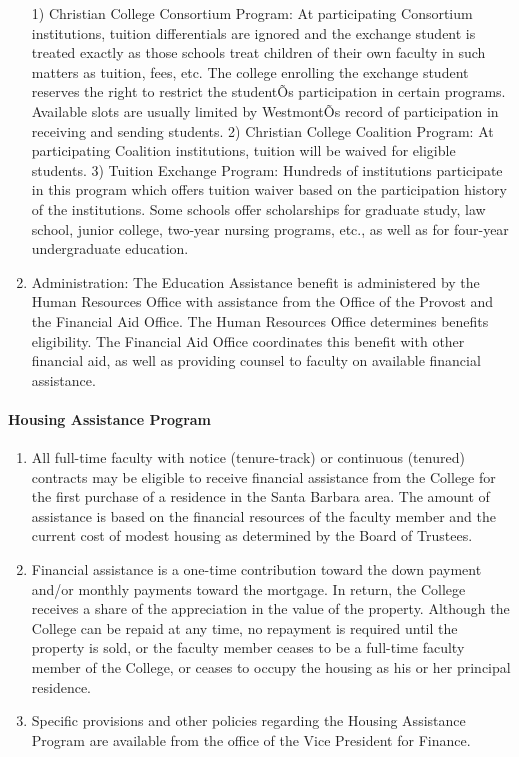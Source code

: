 \documentclass[letterpaper, 11pt]{article}
\begin{document}
\begin{enumerate}[label=\alph*)]
					1) Christian College Consortium Program:  At participating Consortium institutions, tuition differentials are ignored and the exchange student is treated exactly as those schools treat children of their own faculty in such matters as tuition, fees, etc.  The college enrolling the exchange student reserves the right to restrict the studentÕs participation in certain programs.  Available slots are usually limited by WestmontÕs record of participation in receiving and sending students.
					2) Christian College Coalition Program:  At participating Coalition institutions, tuition will be waived for eligible students.
					3) Tuition Exchange Program:  Hundreds of institutions participate in this program which offers tuition waiver based on the participation history of the institutions. Some schools offer scholarships for graduate study, law school, junior college, two-year nursing programs, etc., as well as for four-year undergraduate education.
					\item{Administration:}
					The Education Assistance benefit is administered by the Human Resources Office with assistance from the Office of the Provost and the Financial Aid Office.  The Human Resources Office determines benefits eligibility.  The Financial Aid Office coordinates this benefit with other financial aid, as well as providing counsel to faculty on available financial assistance.
				\end{enumerate}
			\paragraph{Housing Assistance Program}
				\begin{enumerate}[label=\alph*)]
					\item{All full-time faculty with notice (tenure-track) or continuous (tenured) contracts may be eligible to receive financial assistance from the College for the first purchase of a residence in the Santa Barbara area.  The amount of assistance is based on the financial resources of the faculty member and the current cost of modest housing as determined by the Board of Trustees.}
					\item{Financial assistance is a one-time contribution toward the down payment and/or monthly payments toward the mortgage.  In return, the College receives a share of the appreciation in the value of the property.  Although the College can be repaid at any time, no repayment is required until the property is sold, or the faculty member ceases to be a full-time faculty member of the College, or ceases to occupy the housing as his or her principal residence.}
					\item{Specific provisions and other policies regarding the Housing Assistance Program are available from the office of the Vice President for Finance.}
				\end{enumerate}
\end{document}

